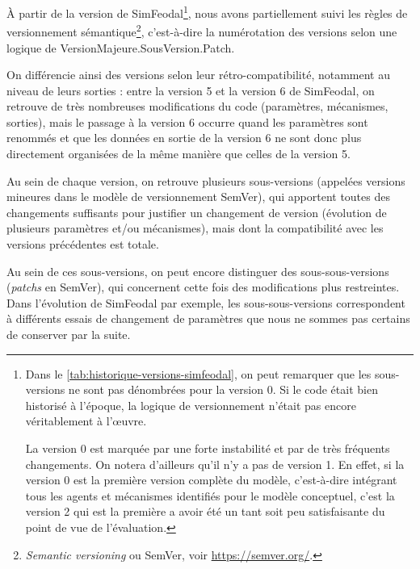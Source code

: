 

À partir de la version \fg{} de SimFeodal\footnote{
	Dans le \cref{tab:historique-versions-simfeodal}, on peut remarquer que les sous-versions ne sont pas dénombrées pour la version 0.
	Si le code était bien historisé à l'époque, la logique de versionnement n'était pas encore véritablement à l'œuvre.
	
	\noindent La version 0 est marquée par une forte instabilité et par de très fréquents changements.
	On notera d'ailleurs qu'il n'y a pas de version 1.
	En effet, si la version 0 est la première version \og complète\fg{} du modèle, c'est-à-dire intégrant tous les agents et mécanismes identifiés pour le modèle conceptuel, c'est la version 2 qui est la première a avoir été un tant soit peu satisfaisante du point de vue de l'évaluation.
}, nous avons partiellement suivi les règles de \og versionnement sémantique\fg{}\footnote{
\og \textit{Semantic versioning}\fg{} ou \og SemVer\fg{}, voir \href{https://semver.org/}{https://semver.org/}.
}, c'est-à-dire la numérotation des versions selon une logique de \og VersionMajeure.SousVersion.Patch\fg{}.

On différencie ainsi des versions selon leur rétro-compatibilité, notamment au niveau de leurs sorties : entre la version 5 et la version 6 de SimFeodal, on retrouve de très nombreuses modifications du code (paramètres, mécanismes, sorties), mais le passage à la version 6 occurre quand les paramètres sont renommés et que les données en sortie de la version 6 ne sont donc plus directement organisées de la même manière que celles de la version 5.

Au sein de chaque version, on retrouve plusieurs sous-versions (appelées \og versions mineures\fg{} dans le modèle de versionnement SemVer), qui apportent toutes des changements suffisants pour justifier un changement de version (évolution de plusieurs paramètres et/ou mécanismes), mais dont la compatibilité avec les versions précédentes est totale.

Au sein de ces sous-versions, on peut encore distinguer des \og sous-sous-versions\fg{} (\og \textit{patchs}\fg{} en SemVer), qui concernent cette fois des modifications plus restreintes.
Dans l'évolution de SimFeodal par exemple, les sous-sous-versions correspondent à différents essais de changement de paramètres que nous ne sommes pas certains de conserver par la suite.

